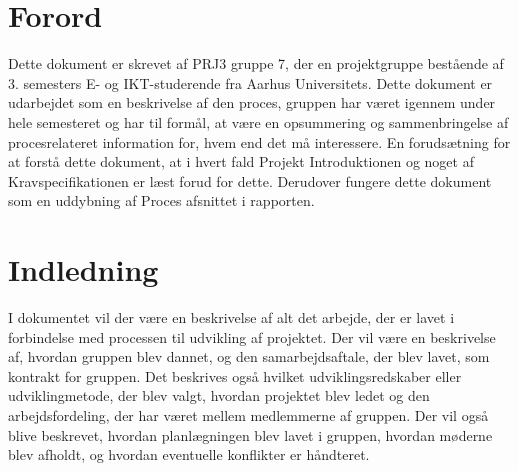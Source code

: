 \documentclass[a4paper,12pt,fleqn,oneside]{article}
\begin{document}

\newpage
\tableofcontents
\newpage

\section{Forord}
Dette dokument er skrevet af PRJ3 gruppe 7, der en projektgruppe bestående af 3. semesters E- og IKT-studerende fra Aarhus Universitets. Dette dokument er udarbejdet som en beskrivelse af den proces, gruppen har været igennem under hele semesteret og har til formål, at være en opsummering og sammenbringelse af procesrelateret information for, hvem end det må interessere. En forudsætning for at forstå dette dokument, at i hvert fald Projekt Introduktionen og noget af Kravspecifikationen er læst forud for dette. Derudover fungere dette dokument som en uddybning af Proces afsnittet i rapporten.

\section{Indledning}
I dokumentet vil der være en beskrivelse af alt det arbejde, der er lavet i forbindelse med processen til udvikling af projektet. Der vil være en beskrivelse af, hvordan gruppen blev dannet, og den samarbejdsaftale, der blev lavet, som kontrakt for gruppen. Det beskrives også hvilket udviklingsredskaber eller udviklingmetode, der blev valgt, hvordan projektet blev ledet og den arbejdsfordeling, der har været mellem medlemmerne af gruppen. Der vil også blive beskrevet, hvordan planlægningen blev lavet i gruppen, hvordan møderne blev afholdt, og hvordan eventuelle konflikter er håndteret.
\end{document}
